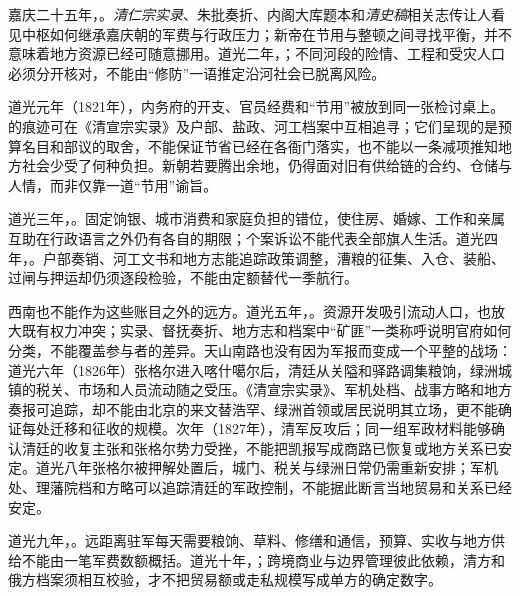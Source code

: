 嘉庆二十五年，。\textit{清仁宗实录}、朱批奏折、内阁大库题本和\textit{清史稿}相关志传让人看见中枢如何继承嘉庆朝的军费与行政压力；新帝在节用与整顿之间寻找平衡，并不意味着地方资源已经可随意挪用。道光二年，；不同河段的险情、工程和受灾人口必须分开核对，不能由“修防”一语推定沿河社会已脱离风险。

道光元年（1821年），内务府的开支、官员经费和“节用”被放到同一张检讨桌上。 的痕迹可在《清宣宗实录》及户部、盐政、河工档案中互相追寻；它们呈现的是预算名目和部议的取舍，不能保证节省已经在各衙门落实，也不能以一条减项推知地方社会少受了何种负担。新朝若要腾出余地，仍得面对旧有供给链的合约、仓储与人情，而非仅靠一道“节用”谕旨。

道光三年，。固定饷银、城市消费和家庭负担的错位，使住房、婚嫁、工作和亲属互助在行政语言之外仍有各自的期限；个案诉讼不能代表全部旗人生活。道光四年，。户部奏销、河工文书和地方志能追踪政策调整，漕粮的征集、入仓、装船、过闸与押运却仍须逐段检验，不能由定额替代一季航行。

西南也不能作为这些账目之外的远方。道光五年，。资源开发吸引流动人口，也放大既有权力冲突；实录、督抚奏折、地方志和档案中“矿匪”一类称呼说明官府如何分类，不能覆盖参与者的差异。天山南路也没有因为军报而变成一个平整的战场：道光六年（1826年）张格尔进入喀什噶尔后，清廷从关隘和驿路调集粮饷，绿洲城镇的税关、市场和人员流动随之受压。《清宣宗实录》、军机处档、战事方略和地方奏报可追踪，却不能由北京的来文替浩罕、绿洲首领或居民说明其立场，更不能确证每处迁移和征收的规模。次年（1827年），清军反攻后；同一组军政材料能够确认清廷的收复主张和张格尔势力受挫，不能把凯报写成商路已恢复或地方关系已安定。道光八年张格尔被押解处置后，城门、税关与绿洲日常仍需重新安排；军机处、理藩院档和方略可以追踪清廷的军政控制，不能据此断言当地贸易和关系已经安定。

道光九年，。远距离驻军每天需要粮饷、草料、修缮和通信，预算、实收与地方供给不能由一笔军费数额概括。道光十年，；跨境商业与边界管理彼此依赖，清方和俄方档案须相互校验，才不把贸易额或走私规模写成单方的确定数字。

